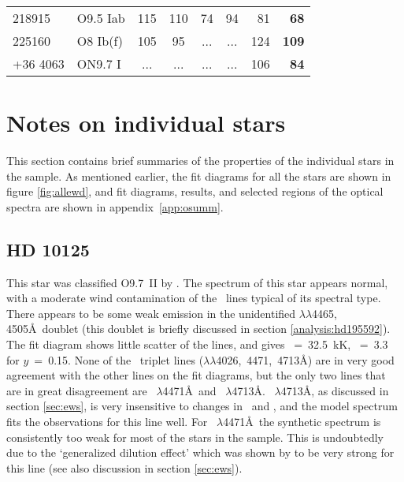 \begin{table}
\begin{center}
\begin{tabular}{llccccrr}
218915 	& O9.5 Iab	& 115	& 110	&  74	&  94	&  81	& {\bf 68} \\
225160	& O8 Ib(f)	& 105	&  95	& ...	& ...	& 124	& {\bf 109} \\
+36 4063& ON9.7 I	& ...	& ...	& ...	& ...	& 106	& {\bf 84} \\
\hline\hline 
\end{tabular}
\end{center}
\end{table} %

\section{Notes on individual stars}
\label{sec:analyses}

This section contains brief summaries of the properties of the
individual stars in the sample. As mentioned earlier, the fit diagrams
for all the stars are shown in figure \ref{fig:allewd}, and fit
diagrams, results, and selected regions of the optical spectra are
shown in appendix~\ref{app:osumm}.

\subsection{HD 10125} %
\label{analysis:hd010125}
This star was classified O9.7~II by .  The spectrum of
this star appears normal, with a moderate wind contamination of the
\hi\ lines typical of its spectral type. There appears to be some weak
emission in the unidentified $\lambda\lambda$4465, 4505\AA\ doublet
(this doublet is briefly discussed in section
\ref{analysis:hd195592}). The fit diagram shows little scatter of the
lines, and gives \teff~=~32.5~kK,
\logg~=~3.3 for $y$~=~0.15. None of the \hei\ triplet lines
($\lambda\lambda$4026,~4471,~4713\AA) are in very good agreement with
the other lines on the fit diagrams, but the only two lines that are
in great disagreement are \hei~$\lambda$4471\AA\ and
\hei~$\lambda$4713\AA. \hei~$\lambda$4713\AA, as discussed in
section \ref{sec:ews}, is very insensitive to changes in \teff\ and
\logg, and the model spectrum fits the observations for this line
well. For \hei~$\lambda$4471\AA\ the synthetic spectrum is
consistently too weak for most of the stars in the sample. This is
undoubtedly due to the `generalized dilution effect' which was shown
by  to be very strong for this line (see also discussion
in section \ref{sec:ews}).



